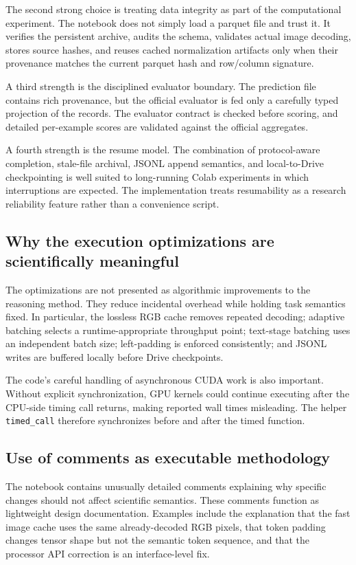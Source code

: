 \documentclass[11pt,a4paper]{article}
\newcommand{\code}[1]{\texttt{#1}}
\begin{document}
The second strong choice is treating data integrity as part of the computational experiment. The notebook does not simply load a parquet file and trust it. It verifies the persistent archive, audits the schema, validates actual image decoding, stores source hashes, and reuses cached normalization artifacts only when their provenance matches the current parquet hash and row/column signature.

A third strength is the disciplined evaluator boundary. The prediction file contains rich provenance, but the official evaluator is fed only a carefully typed projection of the records. The evaluator contract is checked before scoring, and detailed per-example scores are validated against the official aggregates.

A fourth strength is the resume model. The combination of protocol-aware completion, stale-file archival, JSONL append semantics, and local-to-Drive checkpointing is well suited to long-running Colab experiments in which interruptions are expected. The implementation treats resumability as a research reliability feature rather than a convenience script.

\subsection{Why the execution optimizations are scientifically meaningful}
The optimizations are not presented as algorithmic improvements to the reasoning method. They reduce incidental overhead while holding task semantics fixed. In particular, the lossless RGB cache removes repeated decoding; adaptive batching selects a runtime-appropriate throughput point; text-stage batching uses an independent batch size; left-padding is enforced consistently; and JSONL writes are buffered locally before Drive checkpoints.

The code's careful handling of asynchronous CUDA work is also important. Without explicit synchronization, GPU kernels could continue executing after the CPU-side timing call returns, making reported wall times misleading. The helper \code{timed\_call} therefore synchronizes before and after the timed function.

\subsection{Use of comments as executable methodology}
The notebook contains unusually detailed comments explaining why specific changes should not affect scientific semantics. These comments function as lightweight design documentation. Examples include the explanation that the fast image cache uses the same already-decoded RGB pixels, that token padding changes tensor shape but not the semantic token sequence, and that the processor API correction is an interface-level fix.
\end{document}
